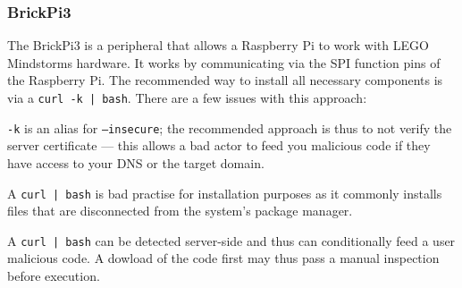 \subsubsection{BrickPi3} \label{brickpi 3}
The BrickPi3 is a peripheral that allows a Raspberry Pi to work with LEGO Mindstorms hardware.
It works by communicating via the SPI function pins of the Raspberry Pi.
The recommended way to install all necessary components is via a \texttt{curl -k | bash}.
There are a few issues with this approach:
\begin{inline-enum}
\item \texttt{-k} is an alias for \texttt{--insecure};
  the recommended approach is thus to not verify the server certificate ---
  this allows a bad actor to feed you malicious code if they have access to your DNS or the target domain.
\item A \texttt{curl | bash} is bad practise for installation purposes as it commonly installs files that are disconnected from the system's package manager.
\item A \texttt{curl | bash} can be detected server-side and thus can conditionally feed a user malicious code.
  A dowload of the code first may thus pass a manual inspection before execution. \parencite{curl-bash}
\end{inline-enum}


